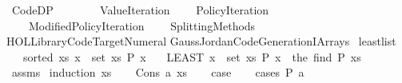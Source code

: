 %
\begin{isabellebody}%
%
%
\isadelimtheory
\isanewline
\isanewline
%
\endisadelimtheory
%
\isatagtheory
{}\isamarkupfalse%
\ Code{\isacharunderscore}{\kern0pt}DP\isanewline
\ \ \ \isanewline
\ \ \ \ Value{\isacharunderscore}{\kern0pt}Iteration\isanewline
\ \ \ \ Policy{\isacharunderscore}{\kern0pt}Iteration\isanewline
\ \ \ \ Modified{\isacharunderscore}{\kern0pt}Policy{\isacharunderscore}{\kern0pt}Iteration\isanewline
\ \ \ \ Splitting{\isacharunderscore}{\kern0pt}Methods\isanewline
\isanewline
{\isachardoublequoteopen}HOL{\isacharminus}{\kern0pt}Library{\isachardot}{\kern0pt}Code{\isacharunderscore}{\kern0pt}Target{\isacharunderscore}{\kern0pt}Numeral{\isachardoublequoteclose}\isanewline
{\isachardoublequoteopen}Gauss{\isacharunderscore}{\kern0pt}Jordan{\isachardot}{\kern0pt}Code{\isacharunderscore}{\kern0pt}Generation{\isacharunderscore}{\kern0pt}IArrays{\isachardoublequoteclose}\isanewline
{}%
\endisatagtheory
{\isafoldtheory}%
%
\isadelimtheory
%
\endisadelimtheory
%
\isadelimdocument
%
\endisadelimdocument
%
\isatagdocument
%
\isamarkuptrue%
%
\isamarkuptrue%
%
\endisatagdocument
{\isafolddocument}%
%
\isadelimdocument
%
\endisadelimdocument
{}\isamarkupfalse%
\ least{\isacharunderscore}{\kern0pt}list{\isacharcolon}{\kern0pt}\isanewline
\ \ \ {\isachardoublequoteopen}sorted\ xs{\isachardoublequoteclose}\ {\isachardoublequoteopen}{\isasymexists}x\ {\isasymin}\ set\ xs{\isachardot}{\kern0pt}\ P\ x{\isachardoublequoteclose}\isanewline
\ \ \ {\isachardoublequoteopen}{\isacharparenleft}{\kern0pt}LEAST\ x\ {\isasymin}\ set\ xs{\isachardot}{\kern0pt}\ P\ x{\isacharparenright}{\kern0pt}\ {\isacharequal}{\kern0pt}\ the\ {\isacharparenleft}{\kern0pt}find\ P\ xs{\isacharparenright}{\kern0pt}{\isachardoublequoteclose}\isanewline
%
\isadelimproof
\ \ %
\endisadelimproof
%
\isatagproof
{}\isamarkupfalse%
\ assms\isanewline
{}\isamarkupfalse%
\ {\isacharparenleft}{\kern0pt}induction\ xs{\isacharparenright}{\kern0pt}\isanewline
\ \ \isamarkupfalse%
\ {\isacharparenleft}{\kern0pt}Cons\ a\ xs{\isacharparenright}{\kern0pt}\isanewline
\ \ \isamarkupfalse%
\ {\isacharquery}{\kern0pt}case\isanewline
\ \ \isamarkupfalse%
\ {\isacharparenleft}{\kern0pt}cases\ {\isachardoublequoteopen}P\ a{\isachardoublequoteclose}{\isacharparenright}{\kern0pt}\isanewline

\end{isabellebody}

